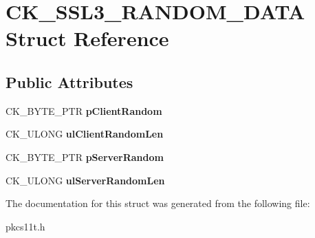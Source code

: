 \hypertarget{struct_c_k___s_s_l3___r_a_n_d_o_m___d_a_t_a}{}\section{C\+K\+\_\+\+S\+S\+L3\+\_\+\+R\+A\+N\+D\+O\+M\+\_\+\+D\+A\+TA Struct Reference}
\label{struct_c_k___s_s_l3___r_a_n_d_o_m___d_a_t_a}
\subsection*{Public Attributes}
\begin{DoxyCompactItemize}
\item 
\mbox{\label{struct_c_k___s_s_l3___r_a_n_d_o_m___d_a_t_a_a755ea91cff2ee6fec1e18ca9c3cef73a}} 
C\+K\+\_\+\+B\+Y\+T\+E\+\_\+\+P\+TR {\bfseries p\+Client\+Random}
\item 
\mbox{\label{struct_c_k___s_s_l3___r_a_n_d_o_m___d_a_t_a_a7600adeb062aab5564a696a245a52d5a}} 
C\+K\+\_\+\+U\+L\+O\+NG {\bfseries ul\+Client\+Random\+Len}
\item 
\mbox{\label{struct_c_k___s_s_l3___r_a_n_d_o_m___d_a_t_a_ae4a4d7d0c9586d996db0d37269ade3ad}} 
C\+K\+\_\+\+B\+Y\+T\+E\+\_\+\+P\+TR {\bfseries p\+Server\+Random}
\item 
\mbox{\label{struct_c_k___s_s_l3___r_a_n_d_o_m___d_a_t_a_a2a275093e7bbe9297b76ed08a7056ceb}} 
C\+K\+\_\+\+U\+L\+O\+NG {\bfseries ul\+Server\+Random\+Len}
\end{DoxyCompactItemize}


The documentation for this struct was generated from the following file\+:\begin{DoxyCompactItemize}
\item 
pkcs11t.\+h\end{DoxyCompactItemize}
